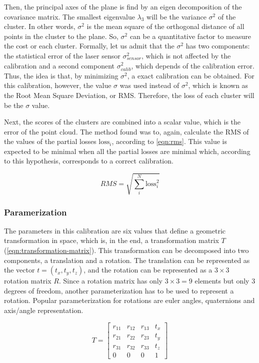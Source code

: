 \documentclass[conference]{IEEEtran}
\begin{document}
Then, the principal axes of the plane is find by an eigen decomposition of the covariance matrix. The smallest eigenvalue $\lambda_3$ will be the variance $\sigma^2$ of the cluster. In other words, $\sigma^2$ is the mean square of the orthogonal distance of all points in the cluster to the plane. So, $\sigma^2$ can be a quantitative factor to measure the cost or each cluster. Formally, let us admit that the $\sigma^2$ has two components: the statistical error of the laser sensor $\sigma^2_{sensor}$, which is not affected by the calibration and a second component $\sigma^2_{calib}$, which depends of the calibration error. Thus, the idea is that, by minimizing $\sigma^2$, a exact calibration can be obtained. For this calibration, however, the value $\sigma$ was used instead of $\sigma^2$, which is known as the Root Mean Square Deviation, or RMS. Therefore, the loss of each cluster will be the $\sigma$ value.

Next, the scores of the clusters are combined into a scalar value, which is the error of the point cloud. The method found was to, again, calculate the RMS of the values of the partial losses $\textrm{loss}_i$, according to \cref{eqn:rms}. This value is expected to be minimal when all the partial losses are minimal which, according to this hypothesis, corresponds to a correct calibration.

\begin{equation}
    \label{eqn:rms}
    RMS = \sqrt{\sum_{i}^{N}{\textrm{loss}_i^2}}
\end{equation}

\subsubsection{Paramerization}

The parameters in this calibration are six values that define a geometric transformation in space, which is, in the end, a transformation matrix $T$ (\cref{eqn:transformation-matrix}). This transformation can be decomposed into two components, a translation and a rotation. The translation can be represented as the vector $t = (t_x, t_y, t_z)$, and the rotation can be represented as a $3 \times 3$ rotation matrix $R$. Since a rotation matrix has only $3 \times 3 = 9$ elements but only 3 degrees of freedom, another parameterization has to be used to represent a rotation. Popular parameterization for rotations are euler angles, quaternions and axis/angle representation. 

\begin{equation}
    \label{eqn:transformation-matrix}
    T = \left[
        \begin{array}{cccc}
            r_{11} & r_{12} & r_{13} & t_x \\
            r_{21} & r_{22} & r_{23} & t_y \\
            r_{31} & r_{32} & r_{33} & t_z \\
            0      & 0      & 0      & 1   
        \end{array}
    \right]
\end{equation}
\end{document}
